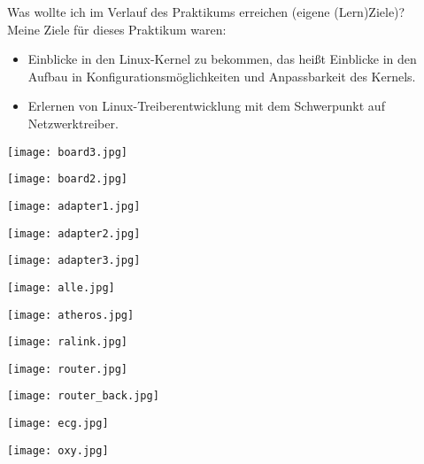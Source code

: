 \documentclass[pdftex,12pt,a4paper]{scrreprt}
\begin{document}
Was wollte ich im Verlauf des Praktikums erreichen (eigene (Lern)Ziele)?\\
Meine Ziele für dieses Praktikum waren:
\begin{itemize}
 \item Einblicke in den Linux-Kernel zu bekommen, das heißt Einblicke in den Aufbau in Konfigurationsmöglichkeiten und Anpassbarkeit des Kernels.
 \item Erlernen von Linux-Treiberentwicklung mit dem Schwerpunkt auf Netzwerktreiber.
\end{itemize}
\begin{center}
\texttt{[image: board3.jpg]}
\end{center}
\begin{center}
\texttt{[image: board2.jpg]}
\end{center}
\begin{center}
\texttt{[image: adapter1.jpg]}
\end{center}
\begin{center}
\texttt{[image: adapter2.jpg]}
\end{center}
\begin{center}
\texttt{[image: adapter3.jpg]}
\end{center}
\begin{center}
\texttt{[image: alle.jpg]}
\end{center}
\begin{center}
\texttt{[image: atheros.jpg]}
\end{center}
\begin{center}
\texttt{[image: ralink.jpg]}
\end{center}
\begin{center}
\texttt{[image: router.jpg]}
\end{center}
\begin{center}
\texttt{[image: router\_back.jpg]}
\end{center}
\begin{center}
\texttt{[image: ecg.jpg]}
\end{center}
\begin{center}
\texttt{[image: oxy.jpg]}
\end{center}
\end{document}
